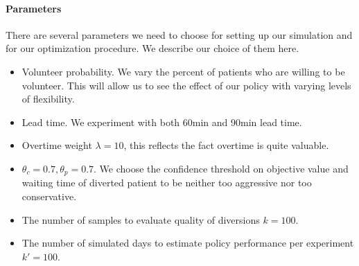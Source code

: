 \paragraph{Parameters}

There are several parameters we need to choose for setting up our simulation
and for our optimization procedure. We describe our choice of them here.

\begin{itemize}
  \item Volunteer probability. We vary the percent of patients who are willing
    to be volunteer. This will allow us to see the effect of our policy
    with varying levels of flexibility.
  \item Lead time. We experiment with both 60min and 90min lead time.
  \item Overtime weight $\lambda = 10$, this reflects the fact overtime is quite valuable.
  \item $\theta_c = 0.7, \theta_p = 0.7$. We choose the confidence threshold on objective value
    and waiting time of diverted patient to be neither too aggressive nor too conservative.
  \item The number of samples to evaluate quality of diversions $k=100$.
  \item The number of simulated days to estimate policy performance per experiment $k'=100$.
\end{itemize}
